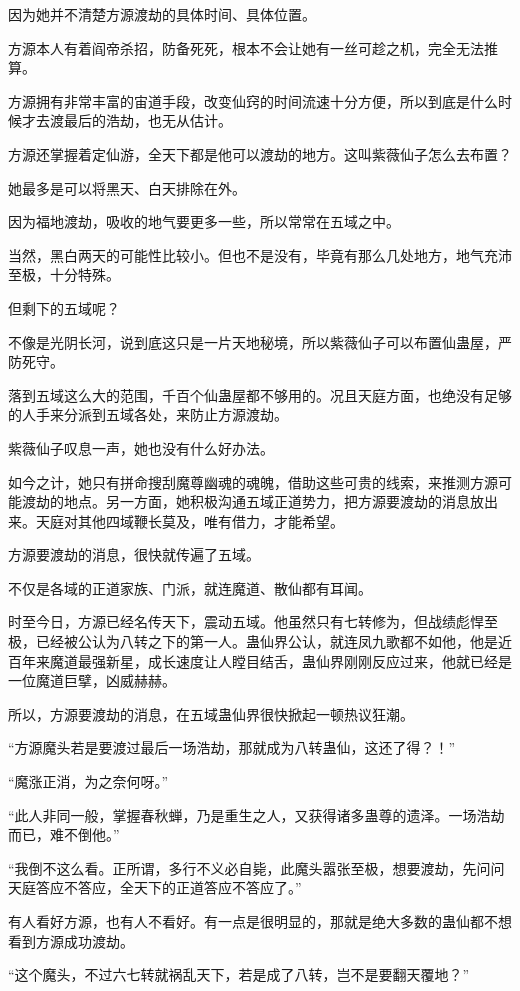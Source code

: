 \begin{this_body}
因为她并不清楚方源渡劫的具体时间、具体位置。

方源本人有着阎帝杀招，防备死死，根本不会让她有一丝可趁之机，完全无法推算。

方源拥有非常丰富的宙道手段，改变仙窍的时间流速十分方便，所以到底是什么时候才去渡最后的浩劫，也无从估计。

方源还掌握着定仙游，全天下都是他可以渡劫的地方。这叫紫薇仙子怎么去布置？

她最多是可以将黑天、白天排除在外。

因为福地渡劫，吸收的地气要更多一些，所以常常在五域之中。

当然，黑白两天的可能性比较小。但也不是没有，毕竟有那么几处地方，地气充沛至极，十分特殊。

但剩下的五域呢？

不像是光阴长河，说到底这只是一片天地秘境，所以紫薇仙子可以布置仙蛊屋，严防死守。

落到五域这么大的范围，千百个仙蛊屋都不够用的。况且天庭方面，也绝没有足够的人手来分派到五域各处，来防止方源渡劫。

紫薇仙子叹息一声，她也没有什么好办法。

如今之计，她只有拼命搜刮魔尊幽魂的魂魄，借助这些可贵的线索，来推测方源可能渡劫的地点。另一方面，她积极沟通五域正道势力，把方源要渡劫的消息放出来。天庭对其他四域鞭长莫及，唯有借力，才能希望。

方源要渡劫的消息，很快就传遍了五域。

不仅是各域的正道家族、门派，就连魔道、散仙都有耳闻。

时至今日，方源已经名传天下，震动五域。他虽然只有七转修为，但战绩彪悍至极，已经被公认为八转之下的第一人。蛊仙界公认，就连凤九歌都不如他，他是近百年来魔道最强新星，成长速度让人瞠目结舌，蛊仙界刚刚反应过来，他就已经是一位魔道巨擘，凶威赫赫。

所以，方源要渡劫的消息，在五域蛊仙界很快掀起一顿热议狂潮。

“方源魔头若是要渡过最后一场浩劫，那就成为八转蛊仙，这还了得？！”

“魔涨正消，为之奈何呀。”

“此人非同一般，掌握春秋蝉，乃是重生之人，又获得诸多蛊尊的遗泽。一场浩劫而已，难不倒他。”

“我倒不这么看。正所谓，多行不义必自毙，此魔头嚣张至极，想要渡劫，先问问天庭答应不答应，全天下的正道答应不答应了。”

有人看好方源，也有人不看好。有一点是很明显的，那就是绝大多数的蛊仙都不想看到方源成功渡劫。

“这个魔头，不过六七转就祸乱天下，若是成了八转，岂不是要翻天覆地？”


\end{this_body}
